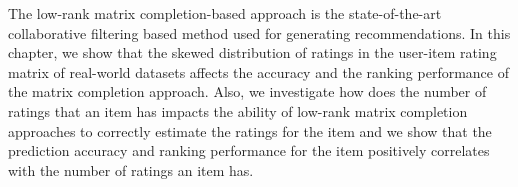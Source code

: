 The low-rank matrix completion-based approach is the state-of-the-art collaborative filtering based method used for generating recommendations.
In this chapter, we show that the skewed distribution of ratings in the
user-item rating matrix of real-world datasets affects the accuracy and the 
ranking performance of the matrix completion approach. 
Also, we investigate how does the number of ratings that an item has impacts the ability of
low-rank matrix completion approaches to correctly estimate the ratings for the
item and we show that the prediction accuracy  and ranking performance 
for the item positively correlates with the number of ratings an item has. 